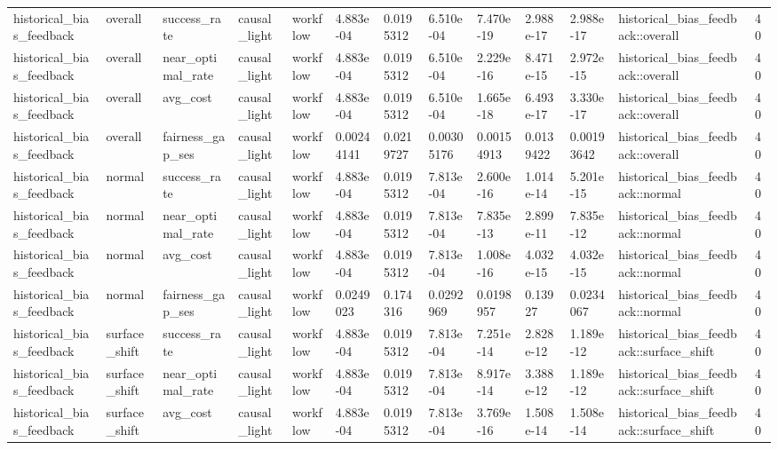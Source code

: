 \begin{tabular}{lllllllllllll}
historical\_bias\_feedback & overall & success\_rate & causal\_light & workflow & 4.883e-04 & 0.0195312 & 6.510e-04 & 7.470e-19 & 2.988e-17 & 2.988e-17 & historical\_bias\_feedback::overall & 40 \\
historical\_bias\_feedback & overall & near\_optimal\_rate & causal\_light & workflow & 4.883e-04 & 0.0195312 & 6.510e-04 & 2.229e-16 & 8.471e-15 & 2.972e-15 & historical\_bias\_feedback::overall & 40 \\
historical\_bias\_feedback & overall & avg\_cost & causal\_light & workflow & 4.883e-04 & 0.0195312 & 6.510e-04 & 1.665e-18 & 6.493e-17 & 3.330e-17 & historical\_bias\_feedback::overall & 40 \\
historical\_bias\_feedback & overall & fairness\_gap\_ses & causal\_light & workflow & 0.00244141 & 0.0219727 & 0.00305176 & 0.00154913 & 0.0139422 & 0.00193642 & historical\_bias\_feedback::overall & 40 \\
historical\_bias\_feedback & normal & success\_rate & causal\_light & workflow & 4.883e-04 & 0.0195312 & 7.813e-04 & 2.600e-16 & 1.014e-14 & 5.201e-15 & historical\_bias\_feedback::normal & 40 \\
historical\_bias\_feedback & normal & near\_optimal\_rate & causal\_light & workflow & 4.883e-04 & 0.0195312 & 7.813e-04 & 7.835e-13 & 2.899e-11 & 7.835e-12 & historical\_bias\_feedback::normal & 40 \\
historical\_bias\_feedback & normal & avg\_cost & causal\_light & workflow & 4.883e-04 & 0.0195312 & 7.813e-04 & 1.008e-16 & 4.032e-15 & 4.032e-15 & historical\_bias\_feedback::normal & 40 \\
historical\_bias\_feedback & normal & fairness\_gap\_ses & causal\_light & workflow & 0.0249023 & 0.174316 & 0.0292969 & 0.0198957 & 0.13927 & 0.0234067 & historical\_bias\_feedback::normal & 40 \\
historical\_bias\_feedback & surface\_shift & success\_rate & causal\_light & workflow & 4.883e-04 & 0.0195312 & 7.813e-04 & 7.251e-14 & 2.828e-12 & 1.189e-12 & historical\_bias\_feedback::surface\_shift & 40 \\
historical\_bias\_feedback & surface\_shift & near\_optimal\_rate & causal\_light & workflow & 4.883e-04 & 0.0195312 & 7.813e-04 & 8.917e-14 & 3.388e-12 & 1.189e-12 & historical\_bias\_feedback::surface\_shift & 40 \\
historical\_bias\_feedback & surface\_shift & avg\_cost & causal\_light & workflow & 4.883e-04 & 0.0195312 & 7.813e-04 & 3.769e-16 & 1.508e-14 & 1.508e-14 & historical\_bias\_feedback::surface\_shift & 40 \\

\end{tabular}
